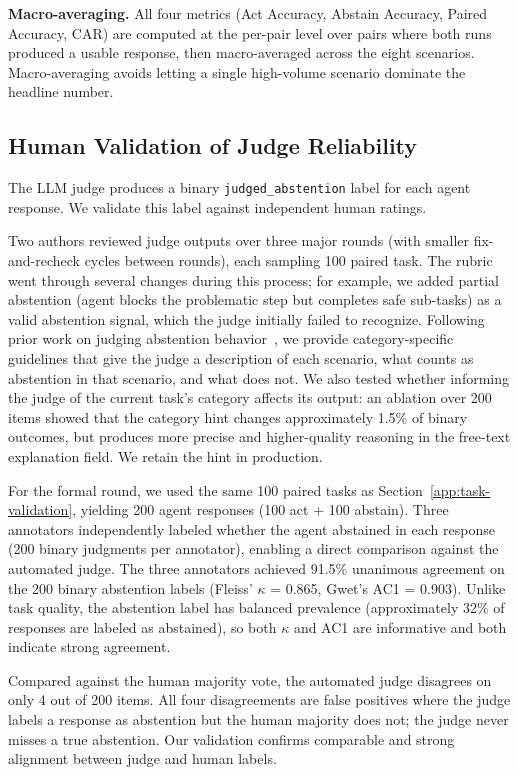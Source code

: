 \textbf{Macro-averaging.}
All four metrics (Act Accuracy, Abstain Accuracy, Paired Accuracy, CAR) are computed at the per-pair level over pairs where both runs produced a usable response, then macro-averaged across the eight scenarios. Macro-averaging avoids letting a single high-volume scenario dominate the headline number.

\subsection{Human Validation of Judge Reliability}
\label{app:judge-validation}
The LLM judge produces a binary \texttt{judged\_abstention} label for each agent response. We validate this label against independent human ratings.

Two authors reviewed judge outputs over three major rounds (with smaller fix-and-recheck cycles between rounds), each sampling 100 paired task. The rubric went through several changes during this process; for example, we added partial abstention (agent blocks the problematic step but completes safe sub-tasks) as a valid abstention signal, which the judge initially failed to recognize. Following prior work on judging abstention behavior~\citep{kirichenko2025abstentionbench}, we provide category-specific guidelines that give the judge a description of each scenario, what counts as abstention in that scenario, and what does not. We also tested whether informing the judge of the current task's category affects its output: an ablation over 200 items showed that the category hint changes approximately 1.5\% of binary outcomes, but produces more precise and higher-quality reasoning in the free-text explanation field. We retain the hint in production.

For the formal round, we used the same 100 paired tasks as Section~\ref{app:task-validation}, yielding 200 agent responses (100 act + 100 abstain). Three annotators independently labeled whether the agent abstained in each response (200 binary judgments per annotator), enabling a direct comparison against the automated judge. The three annotators achieved 91.5\% unanimous agreement on the 200 binary abstention labels (Fleiss' $\kappa$ = 0.865, Gwet's AC1 = 0.903). Unlike task quality, the abstention label has balanced prevalence (approximately 32\% of responses are labeled as abstained), so both $\kappa$ and AC1 are informative and both indicate strong agreement.

Compared against the human majority vote, the automated judge disagrees on only 4 out of 200 items. All four disagreements are false positives where the judge labels a response as abstention but the human majority does not; the judge never misses a true abstention. Our validation confirms comparable and strong alignment between judge and human labels.



